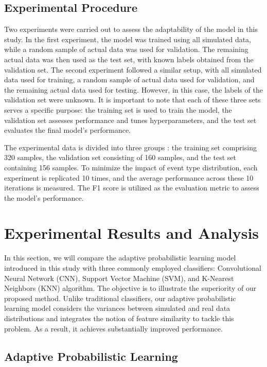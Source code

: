 \documentclass[conference]{IEEEtran}
\begin{document}
\subsection{Experimental Procedure}

Two experiments were carried out to assess the adaptability of the model in this study. In the first experiment, the model was trained using all simulated data, while a random sample of actual data was used for validation. The remaining actual data was then used as the test set, with known labels obtained from the validation set. The second experiment followed a similar setup, with all simulated data used for training, a random sample of actual data used for validation, and the remaining actual data used for testing. However, in this case, the labels of the validation set were unknown. It is important to note that each of these three sets serves a specific purpose: the training set is used to train the model, the validation set assesses performance and tunes hyperparameters, and the test set evaluates the final model's performance.

The experimental data is divided into three groups \cite{zhang2019power}: the training set comprising 320 samples, the validation set consisting of 160 samples, and the test set containing 156 samples. To minimize the impact of event type distribution, each experiment is replicated 10 times, and the average performance across these 10 iterations is measured. The F1 score is utilized as the evaluation metric to assess the model's performance.

\section{Experimental Results and Analysis}

In this section, we will compare the adaptive probabilistic learning model introduced in this study with three commonly employed classifiers: Convolutional Neural Network (CNN), Support Vector Machine (SVM), and K-Nearest Neighbors (KNN) algorithm. The objective is to illustrate the superiority of our proposed method. Unlike traditional classifiers, our adaptive probabilistic learning model considers the variances between simulated and real data distributions and integrates the notion of feature similarity to tackle this problem. As a result, it achieves substantially improved performance.

\subsection{Adaptive Probabilistic Learning}
\end{document}
